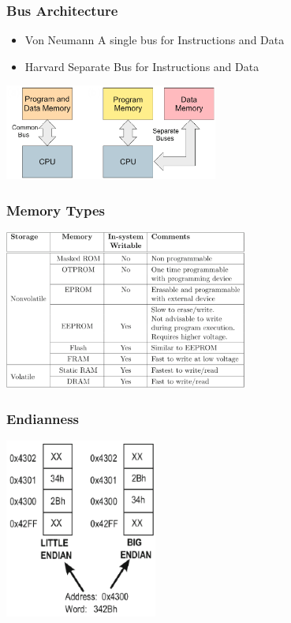 \subsubsection{Bus Architecture}
\begin{minipage}{9cm}
    \begin{itemize}
        \item Von Neumann
        \subitem A single bus for Instructions and Data
        \item Harvard
        \subitem Separate Bus for Instructions and Data
    \end{itemize}
\end{minipage}
\begin{minipage}{7cm}
    \includegraphics[width=7cm]{images/bus.png}
\end{minipage}

\begin{multicols}{2}
\subsubsection{Memory Types}
\includegraphics[width=8cm]{images/memorytypes.png}

\subsubsection{Endianness}
\includegraphics[width=5cm]{images/be_le.png}
\end{multicols}

